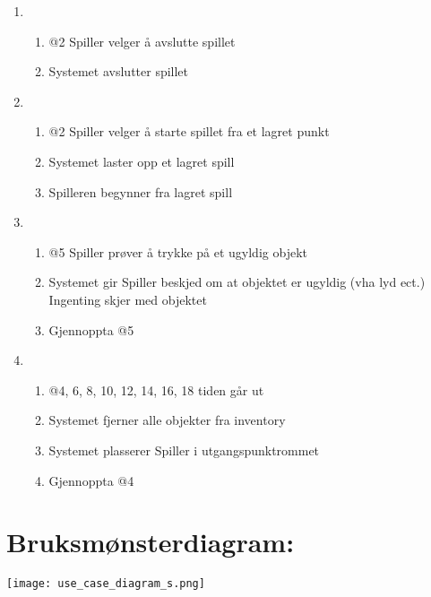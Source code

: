 \documentclass[12pt]{report}
\begin{document}
\begin{enumerate}[label=\Alph*]
\item 
\bigskip

\begin{enumerate}
\item @2 Spiller velger {\aa} avslutte spillet
\item Systemet avslutter spillet
\end{enumerate}
\item 
\bigskip

\begin{enumerate}
\item @2 Spiller velger {\aa} starte spillet fra et lagret punkt
\item Systemet laster opp et lagret spill
\item Spilleren begynner fra lagret spill
\end{enumerate}
\item 
\bigskip

\begin{enumerate}
\item @5 Spiller pr{\o}ver {\aa} trykke p{\aa} et ugyldig objekt
\item Systemet gir Spiller beskjed om at objektet er ugyldig (vha lyd ect.) Ingenting skjer med objektet
\item Gjennoppta @5
\end{enumerate}
\item 
\bigskip

\begin{enumerate}
\item @4, 6, 8, 10, 12, 14, 16, 18 tiden g{\aa}r ut
\item Systemet fjerner alle objekter fra inventory
\item Systemet plasserer Spiller i utgangspunktrommet
\item Gjennoppta @4
\end{enumerate}
\end{enumerate}

\section*{Bruksm{\o}nsterdiagram:}

\texttt{[image: use\_case\_diagram\_s.png]}
\end{document}
